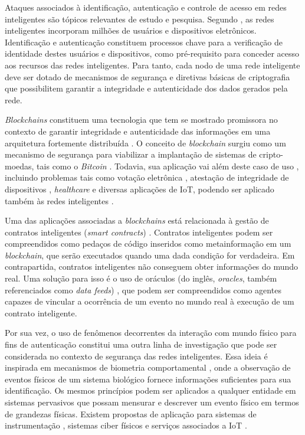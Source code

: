 \documentclass[12pt]{article}
\begin{document}
Ataques associados à identificação, autenticação e controle de acesso em redes inteligentes são tópicos relevantes de estudo e pesquisa. Segundo \cite{Wang2013}, as redes inteligentes incorporam milhões de usuários e dispositivos eletrônicos. Identificação e autenticação constituem processos chave para a verificação de identidade destes usuários e dispositivos, como pré-requisito para conceder acesso aos recursos das redes inteligentes. Para tanto, cada nodo de uma rede inteligente deve ser dotado de mecanismos de segurança e diretivas básicas de criptografia que possibilitem garantir a integridade e autenticidade dos dados gerados pela rede.

\textit{Blockchains} constituem uma tecnologia que tem se mostrado promissora no contexto de garantir integridade e autenticidade das informações em uma arquitetura fortemente distribuída \cite{Zheng2017,Dorri2017}. O conceito de \textit{blockchain} surgiu como um mecanismo de segurança para viabilizar a implantação de sistemas de cripto-moedas, tais como o \textit{Bitcoin} \cite{Nakamoto2008}. Todavia, sua aplicação vai além deste caso de uso \cite{Crosby2016}, incluindo problemas tais como votação eletrônica \cite{Lee2016}, atestação de integridade de dispositivos \cite{sprague2016automated}, \textit{healthcare} \cite{Yue2016} e diversas aplicações de IoT, podendo ser aplicado também às redes inteligentes \cite{Budde2016}.


Uma das aplicações associadas a \textit{blockchains} está relacionada à gestão de contratos inteligentes (\textit{smart contracts}) \cite{Christidis2016}. Contratos inteligentes podem ser compreendidos como pedaços de código inseridos como metainformação em um \textit{blockchain}, que serão executados quando uma dada condição for verdadeira. Em contrapartida, contratos inteligentes não conseguem obter informações do mundo real. Uma solução para isso é o uso de oráculos (do inglês, \textit{oracles}, também referenciados como \textit{data feeds}) \cite{Zhang2016}, que podem ser compreendidos como agentes capazes de vincular a ocorrência de um evento no mundo real à execução de um contrato inteligente.

Por sua vez, o uso de fenômenos decorrentes da interação com mundo físico para fins de autenticação constitui uma outra linha de investigação que pode ser considerada no contexto de segurança das redes inteligentes. Essa ideia é inspirada em mecanismos de biometria comportamental \cite{Yampolskiy2008,Rostami2013,Raju2014}, onde a observação de eventos físicos de um sistema biológico fornece informações suficientes para sua identificação. Os mesmos princípios podem ser aplicados a qualquer entidade em sistemas pervasivos que possam mensurar e descrever um evento físico em termos de grandezas físicas. Existem propostas de aplicação para sistemas de instrumentação \cite{MeloJr.2016}, sistemas ciber físicos \cite{Rostami2013} e serviços associados a IoT \cite{Arafin2017}.
\end{document}
